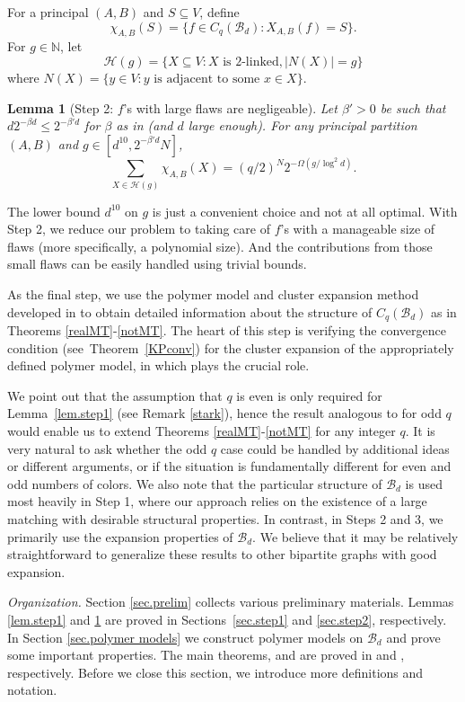 \documentclass{amsart}
\newtheorem{lem}[thm]{Lemma}
\theoremstyle{definition}
\newcommand{\gO}{\Omega}
\newcommand{\cB}{\mathcal{B} }
\newcommand{\cH}{\mathcal{H} }
\newcommand{\beq}[1]{\begin{equation}\label{#1}}
\newcommand{\enq}[0]{\end{equation}}
\newcommand{\sub}[0]{\subseteq}
\newcommand{\0}[0]{\emptyset}
\begin{document}
For a principal $(A,B)$ and $S \sub V$, define
\beq{def.chi}\chi_{A,B}(S)=\{f \in C_q(\cB_d): X_{A,B}(f) = S\}.\enq
For $g \in \mathbb N$, let 
\[\cH(g)=\{X \sub V: X \mbox{ is 2-linked}, |N(X)|=g\}\]
where $N(X)=\{y \in V: y \text{ is adjacent to some } x \in X\}$.
\begin{lem}[Step 2: $f$'s with large flaws are negligeable]\label{lem.step2}
Let $\beta'>0$ be such that $d2^{-\beta d}\le 2^{-\beta' d}$ for $\beta$ as in  (and $d$ large enough). 
For any principal partition $(A, B)$ and $g \in [d^{10}, 2^{-\beta' d}N]$,
\beq{eq.step2} \sum_{X \in \cH(g)} \chi_{A,B}(X) =(q/2)^{N}2^{-\gO(g/\log ^2d)}.\enq
\end{lem}
The lower bound $d^{10}$ on $g$ is just a convenient choice and not at all optimal.
With Step 2, we reduce our problem to taking care of $f$'s with a manageable size of flaws (more specifically, a polynomial size). And the contributions from those small flaws can be easily handled using trivial bounds.

As the final step, we use the polymer model and cluster expansion method developed in \cite{JP} to obtain detailed information about the structure of $C_q(\cB_d)$ as in Theorems \ref{realMT}-\ref{notMT}. The heart of this step is verifying the convergence condition (see~Theorem~\ref{KPconv}) for the cluster expansion of the appropriately defined polymer model, in which  plays the crucial role.

We point out that the assumption that $q$ is even is only required for Lemma~\ref{lem.step1} (see Remark \ref{stark}), hence the result analogous to  for odd $q$ would enable us to extend Theorems \ref{realMT}-\ref{notMT} for any integer $q$. It is very natural to ask whether the odd $q$ case could be handled by additional ideas or  different arguments, or if the situation is fundamentally different for even and odd numbers of colors. 
We also note that the particular structure of $\mathcal{B}_d$ is used most heavily in Step 1, where our approach relies on the existence of a large matching with desirable structural properties. In contrast, in Steps 2 and 3, we primarily use the expansion properties of $\mathcal{B}_d$. We believe that it may be relatively straightforward to generalize these results to other bipartite graphs with good expansion. 
\vspace{5pt}

\noindent\textit{Organization.} Section \ref{sec.prelim} collects various preliminary materials. Lemmas \ref{lem.step1} and \ref{lem.step2} are proved in Sections~\ref{sec.step1} and \ref{sec.step2}, respectively. In Section \ref{sec.polymer models} we construct polymer models on $\cB_d$ and prove some important properties. 
The main theorems,  and  are proved in  and , respectively.
Before we close this section, we introduce more definitions and notation.\vspace{5pt}
\end{document}
